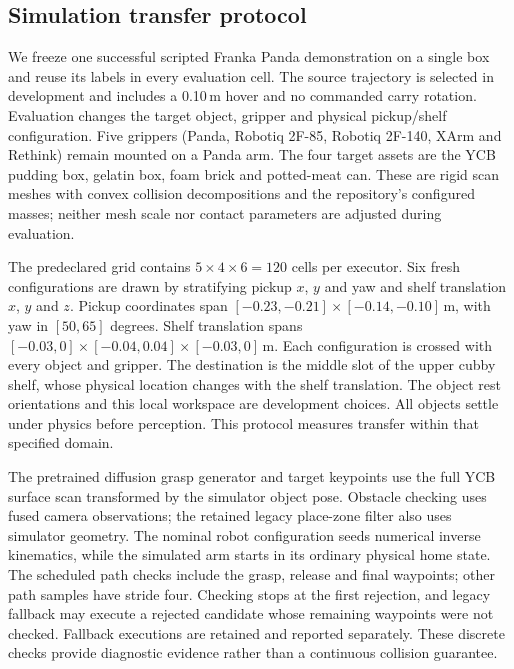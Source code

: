 \subsection{Simulation transfer protocol}
We freeze one successful scripted Franka Panda demonstration on a single box
and reuse its labels in every evaluation cell. The source trajectory is selected
in development and includes a 0.10\,m hover and no commanded carry rotation.
Evaluation changes the target object, gripper and physical pickup/shelf
configuration. Five grippers (Panda, Robotiq 2F-85, Robotiq 2F-140, XArm and
Rethink) remain mounted on a Panda arm. The four target assets are the YCB
pudding box, gelatin box, foam brick and potted-meat can. These are rigid scan
meshes with convex collision decompositions and the repository's configured
masses; neither mesh scale nor contact parameters are adjusted during evaluation.

The predeclared grid contains $5\times4\times6=120$ cells per executor.
Six fresh configurations are drawn by stratifying pickup $x$, $y$ and yaw and
shelf translation $x$, $y$ and $z$. Pickup coordinates span
$[-0.23,-0.21]\times[-0.14,-0.10]$\,m, with yaw in $[50,65]$ degrees.
Shelf translation spans $[-0.03,0]\times[-0.04,0.04]\times[-0.03,0]$\,m.
Each configuration is crossed with every object and gripper. The destination
is the middle slot of the upper cubby shelf, whose physical location changes
with the shelf translation. The object rest orientations and this local
workspace are development choices. All objects settle under physics before
perception. This protocol measures transfer within that specified domain.

The pretrained diffusion grasp generator and target keypoints use the full YCB surface scan transformed
by the simulator object pose. Obstacle checking uses fused camera observations;
the retained legacy place-zone filter also uses simulator geometry. The nominal
robot configuration seeds numerical inverse kinematics, while the simulated arm
starts in its ordinary physical home state. The scheduled path checks include the grasp, release and final waypoints;
other path samples have stride four. Checking stops at the first rejection,
and legacy fallback may execute a rejected candidate whose remaining waypoints
were not checked. Fallback executions are retained and reported separately. These discrete checks provide diagnostic evidence rather than a
continuous collision guarantee.

